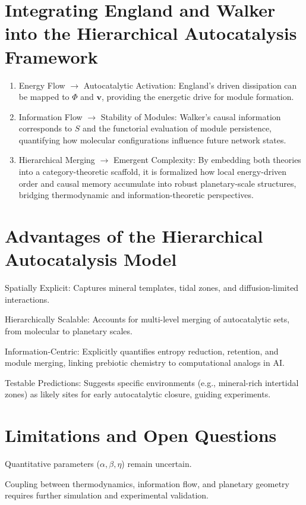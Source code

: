 \documentclass{book}
\begin{document}
\section{Integrating England and Walker into the Hierarchical Autocatalysis Framework}
\begin{enumerate}
\item Energy Flow $\to$ Autocatalytic Activation: England’s driven dissipation can be mapped to $\Phi$ and $\mathbf{v}$, providing the energetic drive for module formation.
\item Information Flow $\to$ Stability of Modules: Walker’s causal information corresponds to $S$ and the functorial evaluation of module persistence, quantifying how molecular configurations influence future network states.
\item Hierarchical Merging $\to$ Emergent Complexity: By embedding both theories into a category-theoretic scaffold, it is formalized how local energy-driven order and causal memory accumulate into robust planetary-scale structures, bridging thermodynamic and information-theoretic perspectives.
\end{enumerate}

\section{Advantages of the Hierarchical Autocatalysis Model}
Spatially Explicit: Captures mineral templates, tidal zones, and diffusion-limited interactions.

Hierarchically Scalable: Accounts for multi-level merging of autocatalytic sets, from molecular to planetary scales.

Information-Centric: Explicitly quantifies entropy reduction, retention, and module merging, linking prebiotic chemistry to computational analogs in AI.

Testable Predictions: Suggests specific environments (e.g., mineral-rich intertidal zones) as likely sites for early autocatalytic closure, guiding experiments.

\section{Limitations and Open Questions}
Quantitative parameters ($\alpha, \beta, \eta$) remain uncertain.

Coupling between thermodynamics, information flow, and planetary geometry requires further simulation and experimental validation.
\end{document}
